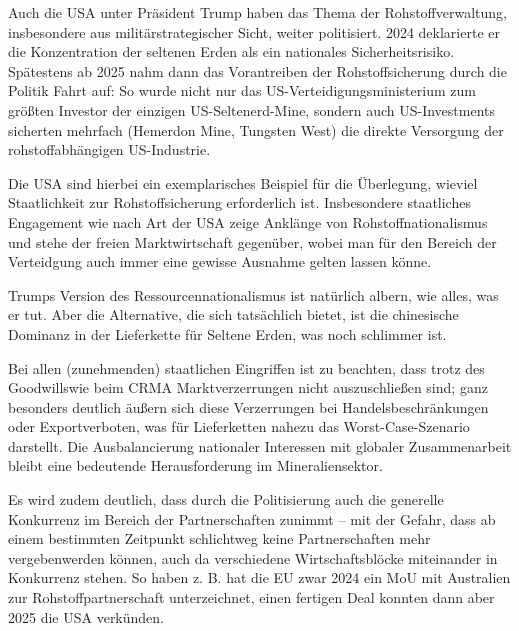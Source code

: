 \documentclass[12pt,a4paper,oneside]{book} %
\begin{document}
Auch die USA unter Präsident Trump haben das Thema der Rohstoffverwaltung, insbesondere aus militärstrategischer Sicht, weiter politisiert. 2024 deklarierte er die Konzentration der seltenen Erden als ein nationales Sicherheitsrisiko.
Spätestens ab 2025 nahm dann das Vorantreiben der Rohstoffsicherung durch die Politik Fahrt auf: So wurde nicht nur das US-Verteidigungsministerium zum größten Investor der einzigen US-Seltenerd-Mine, sondern auch US-Investments sicherten mehrfach (Hemerdon Mine, Tungsten West) die direkte Versorgung der rohstoffabhängigen US-Industrie.

Die USA sind hierbei ein exemplarisches Beispiel für die Überlegung, wieviel Staatlichkeit zur Rohstoffsicherung erforderlich ist. Insbesondere staatliches Engagement wie nach Art der USA zeige Anklänge von Rohstoffnationalismus und stehe der freien Marktwirtschaft gegenüber, wobei man für den Bereich der Verteidgung auch immer eine gewisse Ausnahme gelten lassen könne.\autocite{bibid}

Trumps Version des Ressourcennationalismus ist natürlich albern, wie alles, was er tut. Aber die Alternative, die sich tatsächlich bietet, ist die chinesische Dominanz in der Lieferkette für Seltene Erden, was noch schlimmer ist.

Bei allen (zunehmenden) staatlichen Eingriffen ist zu beachten, dass trotz des \glqq Goodwills\grqq wie beim CRMA Marktverzerrungen nicht auszuschließen sind; ganz besonders deutlich äußern sich diese Verzerrungen bei Handelsbeschränkungen oder Exportverboten, was für Lieferketten nahezu das Worst-Case-Szenario darstellt. Die Ausbalancierung nationaler Interessen mit globaler Zusammenarbeit bleibt eine bedeutende Herausforderung im Mineraliensektor.

Es wird zudem deutlich, dass durch die Politisierung auch die generelle Konkurrenz im Bereich der Partnerschaften zunimmt -- mit der Gefahr, dass ab einem bestimmten Zeitpunkt schlichtweg keine Partnerschaften mehr \glqq vergeben\grqq werden können, auch da verschiedene Wirtschaftsblöcke miteinander in Konkurrenz stehen.
So haben z. B. hat die EU zwar 2024 ein MoU mit Australien zur Rohstoffpartnerschaft unterzeichnet,\autocite{EMORANDUM OF UNDERSTANDING BETWEEN THE EUROPEAN UNION AND
	AUSTRALIA ON A STRATEGIC PARTNERSHIP ON SUSTAINABLE CRITICAL AND STRATEGIC MINERALS} einen fertigen Deal konnten dann aber 2025 die USA verkünden.\autocite{United States-Australia Framework For Securing of Supply in the Mining and Processing of Critical Minerals and Rare Earths}
	
\end{document}
